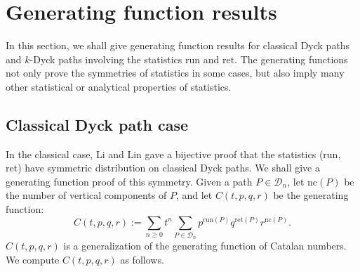 \documentclass[11pt,a4paper,reqno]{article}
\newcommand{\DD}{\mathcal{D}}
\newcommand{\run}{\mathrm{run}}
\newcommand{\ret}{\mathrm{ret}}
\newcommand{\lvl}{\mathrm{nc}}
\begin{document}
{	
	\section{Generating function results}\label{gen}
	In this section, we shall give generating function results for classical Dyck paths and
	$k$-Dyck paths involving the statistics $\run$ and $\ret$. {The generating functions not only prove the symmetries of statistics in some cases, but also imply many other statistical or analytical properties of statistics.}
	\subsection{Classical Dyck path case}
        {In the classical case, Li and Lin \cite{Li} gave a bijective proof that the statistics (run, ret) have symmetric distribution on classical Dyck paths. We shall give a generating function proof of this symmetry.} Given a path $P\in\DD_{n}$, let $\lvl(P)$ be the number of vertical components of $P$, and let
	$C(t,p,q,r)$ be the generating function:
	$$
	C(t,p,q,r):=\sum_{n\geq 0} t^n\sum_{P\in\DD_{n}} p^{\run(P)} q^{\ret(P)} r^{\lvl(P)}.
	$$
	$C(t,p,q,r)$ is a generalization of the generating function of Catalan numbers. We compute $C(t,p,q,r)$ as follows.
	
}
\end{document}
